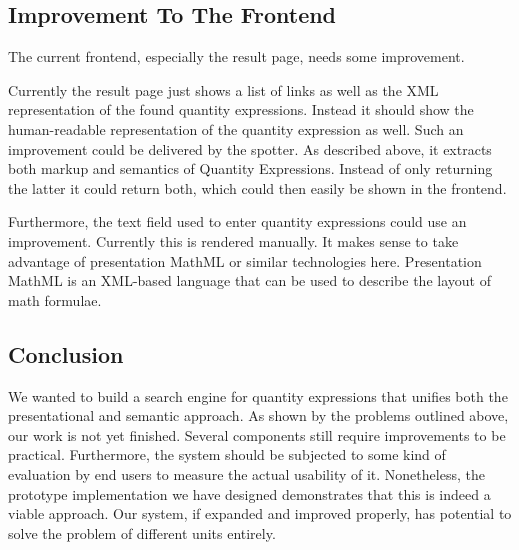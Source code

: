\subsection{Improvement To The Frontend}
\label{sec:fut_res}

The current frontend, especially the result page, needs some improvement.

Currently the result page just shows a list of links as well as the XML representation of the found quantity expressions. Instead it should show the human-readable representation of the quantity expression as well. Such an improvement could be delivered by the spotter. As described above, it extracts both markup and semantics of Quantity Expressions. Instead of only returning the latter it could return both, which could then easily be shown in the frontend.

Furthermore, the text field used to enter quantity expressions could use an improvement. Currently this is rendered manually. It makes sense to take advantage of presentation MathML or similar technologies here. Presentation MathML is an XML-based language that can be used to describe the layout of math formulae.

\subsection{Conclusion}

We wanted to build a search engine for quantity expressions that unifies both the presentational and semantic approach. As shown by the problems outlined above, our work is not yet finished. Several components still require improvements to be practical. Furthermore, the system should be subjected to some kind of evaluation by end users to measure the actual usability of it. Nonetheless, the prototype implementation we have designed demonstrates that this is indeed a viable approach. Our system, if expanded and improved properly, has potential to solve the problem of different units entirely.
